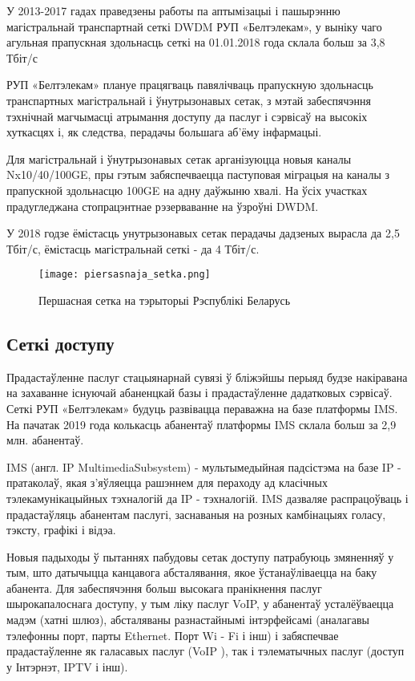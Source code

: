 У 2013-2017 гадах праведзены работы па аптымізацыі і пашырэнню магістральнай транспартнай сеткі DWDM РУП «Белтэлекам», у выніку чаго агульная прапускная здольнасць сеткі на 01.01.2018 года склала больш за 3,8 Тбіт/с

РУП «Белтэлекам» плануе працягваць павялічваць прапускную здольнасць транспартных магістральнай і ўнутрызонавых сетак, з мэтай забеспячэння тэхнічнай магчымасці атрымання доступу да паслуг і сэрвісаў на высокіх хуткасцях і, як следства, перадачы большага аб'ёму інфармацыі.

Для магістральнай і ўнутрызонавых сетак арганізуюцца новыя каналы Nx10/40/100GE, пры гэтым забяспечваецца паступовая міграцыя на каналы з прапускной здольнасцю 100GE на адну даўжыню хвалі. На ўсіх участках прадугледжана стопрацэнтнае рэзерваванне на ўзроўні DWDM.

У 2018 годзе ёмістасць унутрызонавых сетак перадачы дадзеных вырасла да 2,5 Тбіт/с, ёмістасць магістральнай сеткі - да 4 Тбіт/с.

\begin{figure}[ht!]
    \texttt{[image: piersasnaja\_setka.png]}
    \caption{Першасная сетка на тэрыторыі Рэспублікі Беларусь}
\end{figure}

\vspace{-\baselineskip}
\subsection{Сеткі доступу}
Прадастаўленне паслуг стацыянарнай сувязі ў бліжэйшы перыяд будзе накіравана на захаванне існуючай абаненцкай базы і прадастаўленне дадатковых сэрвісаў. Сеткі РУП «Белтэлекам» будуць развівацца пераважна на базе платформы IMS. На пачатак 2019 года колькасць абанентаў платформы IMS склала больш за 2,9 млн. абанентаў.

IMS (англ. IP MultimediaSubsystem) - мультымедыйная падсістэма на базе IP - пратаколаў, якая з'яўляецца рашэннем для пераходу ад класічных тэлекамунікацыйных тэхналогій да IP - тэхналогій. IMS дазваляе распрацоўваць і прадастаўляць абанентам паслугі, заснаваныя на розных камбінацыях голасу, тэксту, графікі і відэа.

Новыя падыходы ў пытаннях пабудовы сетак доступу патрабуюць змяненняў у тым, што датычыцца канцавога абсталявання, якое ўстанаўліваецца на баку абанента. Для забеспячэння больш высокага пранікнення паслуг шырокапалоснага доступу, у тым ліку паслуг VoIP, у абанентаў усталёўваецца мадэм (хатні шлюз), абсталяваны разнастайнымі інтэрфейсамі (аналагавы тэлефонны порт, парты Ethernet. Порт Wi - Fi і інш) і забяспечвае прадастаўленне як галасавых паслуг (VoIP ), так і тэлематычных паслуг (доступ у Інтэрнэт, IPTV і інш).

